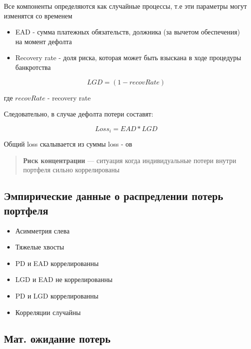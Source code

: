 \documentclass{article}
\begin{document}
            Все компоненты определяются как случайные процессы, т.е эти параметры могут изменятся со временем

            \begin{itemize}
                \item EAD - сумма платежных обязательств, должника (за вычетом обеспечения) на момент дефолта
                \item Recovery rate - доля риска, которая может быть взыскана в ходе процедуры банкротства

            \end{itemize}

            \begin{equation}
                LGD = (1 - recovRate)
            \end{equation}

            где $recovRate$ - recovery rate

            Следовательно, в случае дефолта потери составят:

            \begin{equation}
                Loss_{i} = EAD * LGD
            \end{equation}

            Общий loss скалывается из суммы loss - ов


            \begin{quote}
                \textbf{Риск концентрации} --- ситуация когда индивидуальные потери внутри портфеля сильно коррелированы
            \end{quote}

        \subsection{Эмпирические данные о распредлении потерь портфеля}
            \begin{itemize}
                \item Асимметрия слева
                \item Тяжелые хвосты
                \item PD и EAD коррелированны
                \item LGD и EAD не коррелированны
                \item PD и LGD коррелированны
                \item Корреляции случайны
            \end{itemize}

        \subsection{Мат. ожидание потерь}
\end{document}
